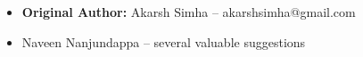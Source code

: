 \begin{itemize}
\item \textbf{Original Author:} Akarsh Simha -- akarshsimha@gmail.com
\item Naveen Nanjundappa -- several valuable suggestions
\end{itemize}
